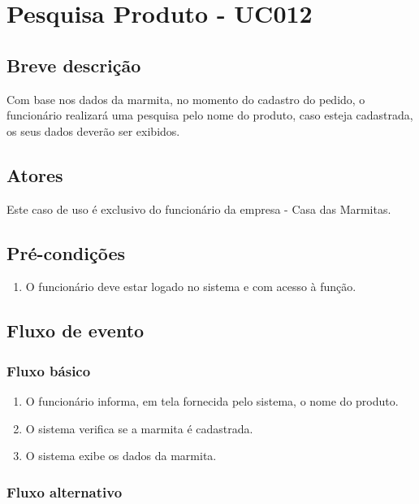 \chapter{Pesquisa Produto - UC012} \label{uc012}

\section{Breve descrição}

Com base nos dados da marmita, no momento do cadastro do pedido, o funcionário realizará uma pesquisa pelo nome do produto, caso esteja cadastrada, os seus dados deverão ser exibidos.

\section{Atores}

Este caso de uso é exclusivo do funcionário da empresa - Casa das Marmitas.

\section{Pré-condições}

\begin{enumerate}
	\item O funcionário deve estar logado no sistema e com acesso à função.
\end{enumerate}

\section{Fluxo de evento}

\subsection{Fluxo básico}

\begin{enumerate}
	\item O funcionário informa, em tela fornecida pelo sistema, o nome do produto.	
	\item O sistema verifica se a marmita é cadastrada.
	\item O sistema exibe os dados da marmita.
\end{enumerate}

\subsection{Fluxo alternativo}

